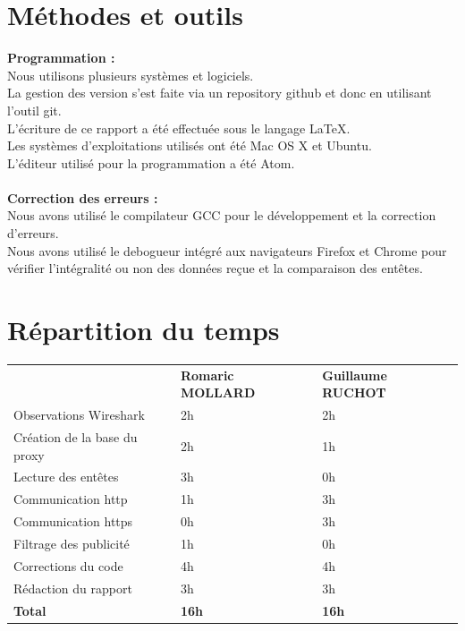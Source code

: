 \documentclass{scrreprt}
\begin{document}
\section{Méthodes et outils}
\textbf{Programmation :}\\
Nous utilisons plusieurs systèmes et logiciels.\\
La gestion des version s'est faite via un repository github et donc en utilisant l'outil git.\\
L'écriture de ce rapport a été effectuée sous le langage LaTeX.\\
Les systèmes d'exploitations utilisés ont été Mac OS X et Ubuntu.\\
L'éditeur utilisé pour la programmation a été Atom.\\\\
\textbf{Correction des erreurs :}\\
Nous avons utilisé le compilateur GCC pour le développement et la correction d'erreurs.\\
Nous avons utilisé le debogueur intégré aux navigateurs Firefox et Chrome pour vérifier l'intégralité ou non des données reçue et la comparaison des entêtes.

\section{Répartition du temps}

\begin{tabular}{lll}
                                          & \textbf{Romaric MOLLARD} & \textbf{Guillaume RUCHOT} \\
Observations Wireshark                    & 2h              & 2h            \\
Création de la base du proxy              & 2h              & 1h            \\
Lecture des entêtes                       & 3h              & 0h            \\
Communication http                        & 1h              & 3h            \\
Communication https                       & 0h              & 3h            \\
Filtrage des publicité                    & 1h              & 0h            \\
Corrections du code                       & 4h              & 4h           \\
Rédaction du rapport                      & 3h              & 3h           \\
\textbf{Total}                            & \textbf{16h}             & \textbf{16h}
\end{tabular}
\end{document}
